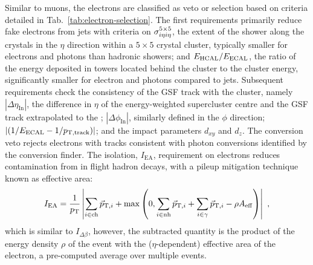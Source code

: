 Similar to muons, the electrons are classified as veto or selection based on criteria detailed in Tab.~\ref{tab:electron-selection}. The first requirements primarily reduce fake electrons from jets with criteria on $\sigma_{i\eta i\eta}^{5\times 5}$, the extent of the shower along the \ECAL crystals in the $\eta$ direction within a $5\times 5$ crystal cluster, typically smaller for electrons and photons than hadronic showers; and $E_{\mathrm{HCAL}}/E_{\mathrm{ECAL}}$, the ratio of the energy deposited in \HCAL towers located behind the \ECAL cluster to the \ECAL cluster energy, significantly smaller for electron and photons compared to jets. Subsequent requirements check the consistency of the GSF track with the \ECAL cluster, namely $|\Delta\eta_{\mathrm{In}}|$, the difference in $\eta$ of the energy-weighted supercluster centre and the GSF track extrapolated to the \ECAL; $|\Delta\phi_{\mathrm{In}}|$, similarly defined in the $\phi$ direction; $|(1/E_{\mathrm{ECAL}} - 1/p_{\mathrm{T,track}})|$; and the impact parameters $d_{xy}$ and $d_{z}$. The conversion veto rejects electrons with tracks consistent with photon conversions identified by the conversion finder. The isolation, $I_{\mathrm{EA}}$, requirement on electrons reduces contamination from in flight hadron decays, with a pileup mitigation technique known as effective area:
%
\begin{equation}
    I_{\mathrm{EA}} = \frac{1}{p_{\text{T}}} \left| \sum_{i\in\mathrm{ch}} \vec{p}_{\mathrm{T},i} + \max\left(0, \sum_{i\in\mathrm{nh}}\vec{p}_{\mathrm{T},i} + \sum_{i\in\gamma}\vec{p}_{\mathrm{T},i} - \rho A_{\mathrm{eff}}\right) \right|\ ,
\end{equation}
%
which is similar to $I_{\Delta\beta}$, however, the subtracted quantity is the product of the energy density $\rho$ of the event with the ($\eta$-dependent) effective area of the electron, a pre-computed average over multiple events.

